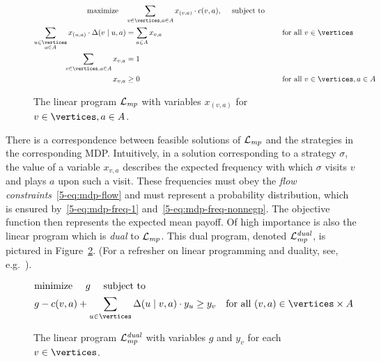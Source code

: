
\begin{figure}[h]
	\begin{alignat}{2}
	\text{{maximize}} \quad &\sum_{v\in \vertices, a \in \actions} x_{(v,a)} \cdot \colouring(v,a),\quad \textrm{ 
			subject to }\nonumber \\
	  \sum_{\substack{u\in\vertices\\ a \in \actions}} x_{(u,a)}\cdot \probTranFunc(v\mid u,a) &= \sum_{a \in \actions} x_{v,a}
		&\quad&\text{for all $v\in \vertices$}\label{5-eq:mdp-flow} \\
	 \sum_{v\in\vertices,a\in \actions} x_{v,a}&=1 &&\label{5-eq:mdp-freq-1} \\
	 x_{v,a} &\geq 0  &&\text{for all $v\in \vertices,a\in \actions$} \label{5-eq:mdp-freq-nonnegp}
	\end{alignat}
	\caption{The linear program $\mathcal{L}_{\mathit{mp}}$ with variables $x_{(v,a)}$ for  $v\in \vertices,a\in \actions$.}
	\label{5-fig:mp-lin}
\end{figure}

There is a correspondence between feasible solutions of $\mathcal{L}_{\mathit{mp}}$ and the strategies in the corresponding MDP. Intuitively, in a solution corresponding to a strategy $\sigma$, the value of a variable $x_{v,a}$ describes the expected frequency with which $\sigma$ visits $v$ and plays $a$ upon such a visit. These frequencies must obey the \emph{flow constraints}~\eqref{5-eq:mdp-flow} and must represent a probability distribution, which is ensured by~\eqref{5-eq:mdp-freq-1} and~\eqref{5-eq:mdp-freq-nonnegp}. The objective function then represents the expected mean payoff. Of high importance is also the linear program which is \emph{dual} to $\mathcal{L}_{\mathit{mp}}$. This dual program, denoted $\mathcal{L}_{\mathit{mp}}^{\mathit{dual}}$, is pictured in Figure~\ref{5-fig:mp-dual}. (For a refresher on linear programming and duality, see, e.g.~\cite{Matousek:2007}).

\begin{figure}[h]
	\begin{alignat}{2}
	&\text{{minimize} }\quad g \quad \textrm{ 
		subject to }\nonumber \\
	&g -\colouring(v,a) + \sum_{u\in\vertices}\probTranFunc(u\mid v,a)\cdot y_u \geq y_v 
	\quad\text{for all $(v,a)\in \vertices\times \actions$}\label{5-eq:mp-lpdual}
	\end{alignat}
	\caption{The linear program $\mathcal{L}_{\mathit{mp}}^{\mathit{dual}}$ with variables $g$ and $y_v$ for each  $v\in \vertices$.}
	\label{5-fig:mp-dual}
\end{figure}

